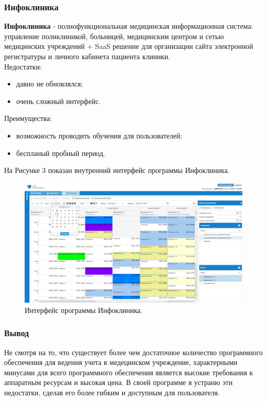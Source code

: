 \documentclass[a4paper, 10pt]{article}
\begin{document}
 	\subsubsection{Инфоклиника}
 	{\bf Инфоклиника} - полнофункциональная медицинская информационная система: управление поликлиникой, больницей, медицинским центром и сетью медицинских учреждений + SaaS решение для организации сайта электронной регистратуры и личного кабинета пациента клиники.
 	\\Недостатки:
 	\begin{itemize}
 		\item давно не обновлялся;
 		\item очень сложный интерфейс.
 	\end{itemize}
 	Преимущества:
 	\begin{itemize}
 		\item возможность проводить обучения для пользователей;
 		\item беспланый пробный период.
 	\end{itemize}
 	На Рисунке 3 показан внутренний интерфейс программы Инфоклиника.
 	\clearpage
 	\newpage
 	\begin{figure}[h!]
 		\centering
 		\includegraphics[scale=0.8]{infoklinika}
 		\centering\caption{Интерфейс программы Инфоклиника.}
 	\end{figure}
	\subsubsection{Вывод}
	\hspace*{5mm} Не смотря на то, что существует более чем достаточное количество программного обеспечения для ведения учета в медецинском учреждение, характерными минусами для всего программного обеспечения является высокие требования к аппаратным ресурсам и высокая цена. В своей программе я устраню эти недостатки, сделав его более гибким и доступным для пользователя.
\end{document}
